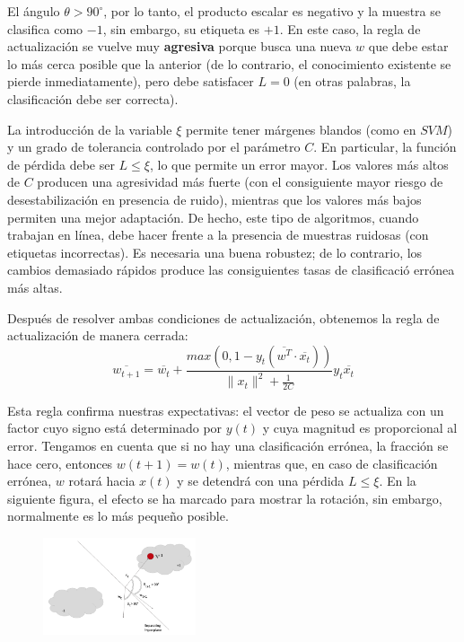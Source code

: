 \documentclass[letterpaper,11pt]{article}
\begin{document}
El ángulo $\theta > 90^{\circ}$, por lo tanto, el producto escalar es negativo 
y la muestra se clasifica como $-1$, sin embargo, su etiqueta es $+1$. En este 
caso, la regla de actualización se vuelve muy \textbf{agresiva} porque busca
una nueva $w$ que debe estar lo más cerca posible que la anterior (de lo 
contrario, el conocimiento existente se pierde inmediatamente), pero debe 
satisfacer $L = 0$ (en otras palabras, la clasificación debe ser correcta). 

La introducción de la variable $\xi$ permite tener márgenes blandos (como en 
$SVM$) y un grado de tolerancia controlado por el parámetro $C$. En particular,
la función de pérdida debe ser $L \leq \xi$, lo que permite un error mayor. 
Los valores más altos de $C$ producen una agresividad más fuerte (con el 
consiguiente mayor riesgo de desestabilización en presencia de ruido), mientras 
que los valores más bajos permiten una mejor adaptación. De hecho, este tipo 
de algoritmos, cuando trabajan en línea, debe hacer frente a la presencia de 
muestras ruidosas (con etiquetas incorrectas). Es necesaria una buena 
robustez; de lo contrario, los cambios demasiado rápidos produce las 
consiguientes tasas de clasificació errónea más altas.

Después de resolver ambas condiciones de actualización, obtenemos la regla de 
actualización de manera cerrada:
\begin{equation*}
    \overline{w_{t+1}} = \overline{w_t} +
    \frac{max(0, 1 - y_t (\overline{w^T} \cdot \overline{x_t}))}
         {\| x_t \|^2 + \frac{1}{2C}} y_t \overline{x_t}
\end{equation*}

Esta regla confirma nuestras expectativas: el vector de peso se actualiza con
un factor cuyo signo está determinado por $y(t)$ y cuya magnitud es proporcional
al error. Tengamos en cuenta que si no hay una clasificación errónea, la fracción
se hace cero, entonces $w(t+1) = w(t)$, mientras que, en caso de clasificación 
errónea, $w$ rotará hacia $x(t)$ y se detendrá con una pérdida $L \leq \xi$. 
En la siguiente figura, el efecto se ha marcado para mostrar la rotación, sin 
embargo, normalmente es lo más pequeño posible.
\begin{figure}[h]
    \centering
    \includegraphics[width=0.4\textwidth]{./imagenes/pa2.png}
\end{figure} 
\end{document}
